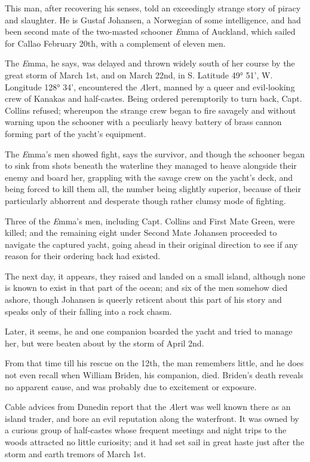 This man, after recovering his senses, told an exceedingly strange story of piracy and slaughter. He is Gustaf Johansen, a Norwegian of some intelligence, and had been second mate of the two-masted schooner {\emph Emma} of Auckland, which sailed for Callao February 20th, with a complement of eleven men.

The {\emph Emma}, he says, was delayed and thrown widely south of her course by the great storm of March 1st, and on March 22nd, in S. Latitude 49° 51', W. Longitude 128° 34', encountered the {\emph Alert}, manned by a queer and evil-looking crew of Kanakas and half-castes. Being ordered peremptorily to turn back, Capt. Collins refused; whereupon the strange crew began to fire savagely and without warning upon the schooner with a peculiarly heavy battery of brass cannon forming part of the yacht’s equipment.

The {\emph Emma}’s men showed fight, says the survivor, and though the schooner began to sink from shots beneath the waterline they managed to heave alongside their enemy and board her, grappling with the savage crew on the yacht’s deck, and being forced to kill them all, the number being slightly superior, because of their particularly abhorrent and desperate though rather clumsy mode of fighting.

Three of the {\emph Emma}’s men, including Capt. Collins and First Mate Green, were killed; and the remaining eight under Second Mate Johansen proceeded to navigate the captured yacht, going ahead in their original direction to see if any reason for their ordering back had existed.

The next day, it appears, they raised and landed on a small island, although none is known to exist in that part of the ocean; and six of the men somehow died ashore, though Johansen is queerly reticent about this part of his story and speaks only of their falling into a rock chasm.

Later, it seems, he and one companion boarded the yacht and tried to manage her, but were beaten about by the storm of April 2nd.

From that time till his rescue on the 12th, the man remembers little, and he does not even recall when William Briden, his companion, died. Briden’s death reveals no apparent cause, and was probably due to excitement or exposure.

Cable advices from Dunedin report that the {\emph Alert} was well known there as an island trader, and bore an evil reputation along the waterfront. It was owned by a curious group of half-castes whose frequent meetings and night trips to the woods attracted no little curiosity; and it had set sail in great haste just after the storm and earth tremors of March 1st.

